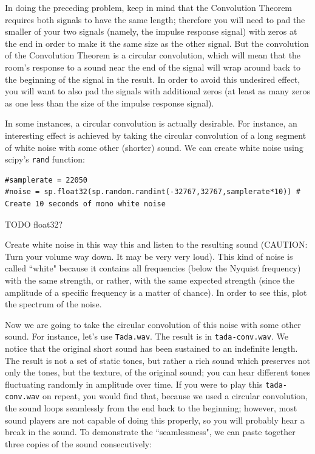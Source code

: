 In doing the preceding problem, keep in mind that the Convolution Theorem requires both signals to have the same length; therefore you will need to pad the smaller of your two signals (namely, the impulse response signal) with zeros at the end in order to make it the same size as the other signal. But the convolution of the Convolution Theorem is a circular convolution, which will mean that the room's response to a sound near the end of the signal will wrap around back to the beginning of the signal in the result. In order to avoid this undesired effect, you will want to also pad the signals with additional zeros (at least as many zeros as one less than the size of the impulse response signal).

In some instances, a circular convolution is actually desirable. For instance, an interesting effect is achieved by taking the circular convolution of a long segment of white noise with some other (shorter) sound. We can create white noise using scipy's \texttt{rand} function:
\begin{lstlisting}
#samplerate = 22050
#noise = sp.float32(sp.random.randint(-32767,32767,samplerate*10)) # Create 10 seconds of mono white noise
\end{lstlisting}

TODO float32?

\begin{problem}
Create white noise in this way this and listen to the resulting sound (CAUTION: Turn your volume way down.  It may be very very loud).  This kind of noise is called ``white" because it contains all frequencies (below the Nyquist frequency) with the same strength, or rather, with the same expected strength (since the amplitude of a specific frequency is a matter of chance). In order to see this, plot the spectrum of the noise.
\end{problem}

Now we are going to take the circular convolution of this noise with some other sound. For instance, let's use \texttt{Tada.wav}. The result is in \texttt{tada-conv.wav}. We notice that the original short sound has been sustained to an indefinite length. The result is not a set of static tones, but rather a rich sound which preserves not only the tones, but the texture, of the original sound; you can hear different tones fluctuating randomly in amplitude over time. If you were to play this \texttt{tada-conv.wav} on repeat, you would find that, because we used a circular convolution, the sound loops seamlessly from the end back to the beginning; however, most sound players are not capable of doing this properly, so you will probably hear a break in the sound. To demonstrate the ``seamlessness", we can paste together three copies of the sound consecutively:

